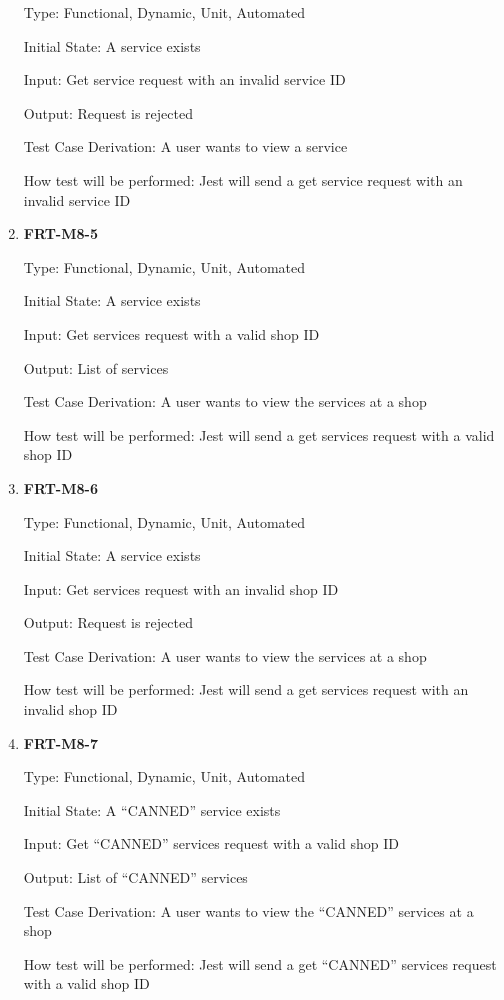 \documentclass[12pt, titlepage]{article}
\begin{document}
\begin{enumerate}
	      Type: Functional, Dynamic, Unit, Automated

	      Initial State: A service exists

	      Input: Get service request with an invalid service ID

	      Output: Request is rejected

	      Test Case Derivation: A user wants to view a service

	      How test will be performed: Jest will send a get service request with an invalid service ID

	\item \textbf{FRT-M8-5}

	      Type: Functional, Dynamic, Unit, Automated

	      Initial State: A service exists

	      Input: Get services request with a valid shop ID

	      Output: List of services

	      Test Case Derivation: A user wants to view the services at a shop

	      How test will be performed: Jest will send a get services request with a valid shop ID

	\item \textbf{FRT-M8-6}

	      Type: Functional, Dynamic, Unit, Automated

	      Initial State: A service exists

	      Input: Get services request with an invalid shop ID

	      Output: Request is rejected

	      Test Case Derivation: A user wants to view the services at a shop

	      How test will be performed: Jest will send a get services request with an invalid shop ID

	\item \textbf{FRT-M8-7}

	      Type: Functional, Dynamic, Unit, Automated

	      Initial State: A ``CANNED'' service exists

	      Input: Get ``CANNED'' services request with a valid shop ID

	      Output: List of ``CANNED'' services

	      Test Case Derivation: A user wants to view the ``CANNED'' services at a shop

	      How test will be performed: Jest will send a get ``CANNED'' services request with a valid shop ID


\end{enumerate}
\end{document}
